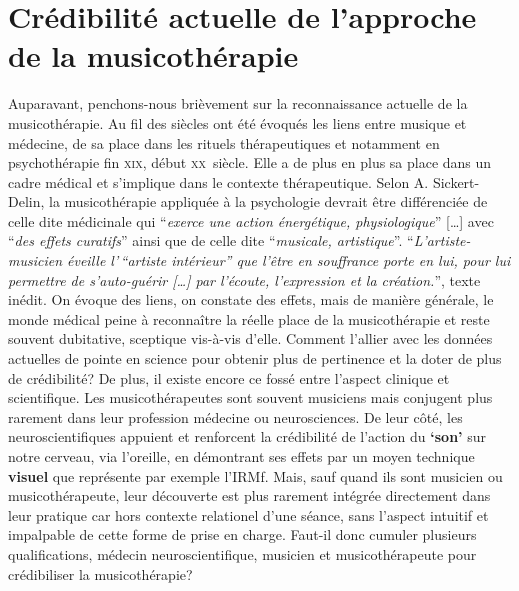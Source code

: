 \section{Crédibilité actuelle de l'approche de la musicothérapie }

Auparavant, penchons-nous brièvement sur la reconnaissance actuelle de la musicothérapie.
Au fil des siècles ont été évoqués les liens entre musique et médecine, de sa place dans les
rituels thérapeutiques et notamment en psychothérapie fin \textsc{xix}\ieme,
début \textsc{xx}\ieme\ siècle.
Elle a de plus en plus sa place dans un cadre médical et s'implique dans le contexte thérapeutique.
Selon A. Sickert-Delin, la musicothérapie appliquée à la
psychologie devrait être différenciée de celle dite médicinale qui
\enquote{\emph{exerce une action
énergétique, physiologique}} [\dots] avec \enquote{\emph{des effets curatifs}}
ainsi que de celle dite \enquote{\emph{musicale, artistique}}.
\enquote{\emph{L'artiste-musicien éveille l'\,``artiste intérieur'' que l'être
en souffrance porte en lui, pour lui permettre de s'auto-guérir [\dots] par
l'écoute, l'expression et la création.}}\autocite[14] {viret:b},
texte inédit.
On évoque des liens, on constate des effets, mais de manière générale, le monde médical peine à reconnaître la réelle place de la musicothérapie et reste souvent dubitative, sceptique vis-à-vis d'elle.
 Comment l'allier avec les données actuelles de pointe en
science pour obtenir plus de pertinence
et la doter de plus de crédibilité?
De plus, il existe encore ce fossé entre l'aspect clinique et scientifique.
Les musicothérapeutes sont souvent musiciens mais conjugent plus
rarement dans leur profession
médecine ou neurosciences. De leur côté, les neuroscientifiques appuient
et renforcent la crédibilité de l'action du \textbf{`son'} sur notre cerveau, via
l'oreille, en démontrant ses effets par un moyen technique
\textbf{visuel} que représente par exemple l'IRMf. Mais, sauf quand ils sont musicien ou
musicothérapeute, leur découverte est plus rarement intégrée
directement dans leur pratique car hors contexte relationel d'une
séance, sans l'aspect intuitif et impalpable de cette forme de prise
en charge.
Faut-il donc cumuler plusieurs qualifications, médecin neuroscientifique,  musicien et musicothérapeute pour crédibiliser la musicothérapie?

